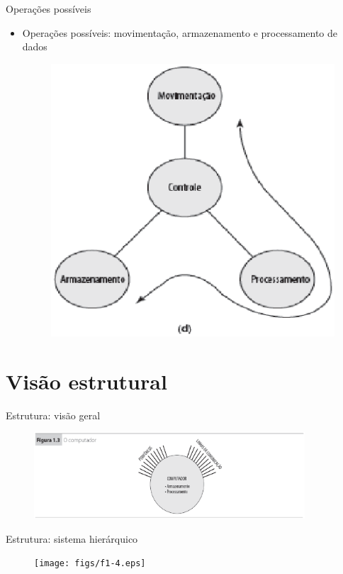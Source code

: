 \begin{slide}{Operações possíveis}
    \begin{itemize}
       \item Operações possíveis: movimentação, armazenamento e processamento de dados
       \begin{figure}[h]
      \centering
      \includegraphics[height = 0.55\textheight]{figs/f1-2c.eps}
    \end{figure}
    \end{itemize}
 \end{slide}
 
 \section[ slide = true]{Visão estrutural}
 \begin{slide}[toc=]{Estrutura: visão geral}
    \begin{figure}[h]
      \centering
      \includegraphics[width = 0.9\textwidth]{figs/f1-3.eps}
    \end{figure}
 \end{slide}
 
 \begin{slide}[toc=]{Estrutura: sistema hierárquico}
    \begin{figure}[h]
      \centering
      \texttt{[image: figs/f1-4.eps]}
    \end{figure}
\end{slide}
 
 
